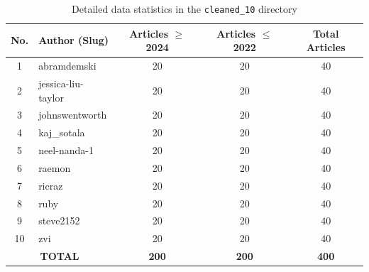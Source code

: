 \documentclass[12pt, a4paper]{article}
\begin{document}
\begin{table}[H]
\centering
\caption{Detailed data statistics in the \texttt{cleaned\_10} directory}
\label{tab:dataset_c10}
\begin{tabular}{|c|l|c|c|c|}
\hline
\textbf{No.} & \textbf{Author (Slug)} & \textbf{Articles $\ge$ 2024} & \textbf{Articles $\le$ 2022} & \textbf{Total Articles} \\ \hline
1 & abramdemski & 20 & 20 & 40 \\ \hline
2 & jessica-liu-taylor & 20 & 20 & 40 \\ \hline
3 & johnswentworth & 20 & 20 & 40 \\ \hline
4 & kaj\_sotala & 20 & 20 & 40 \\ \hline
5 & neel-nanda-1 & 20 & 20 & 40 \\ \hline
6 & raemon & 20 & 20 & 40 \\ \hline
7 & ricraz & 20 & 20 & 40 \\ \hline
8 & ruby & 20 & 20 & 40 \\ \hline
9 & steve2152 & 20 & 20 & 40 \\ \hline
10 & zvi & 20 & 20 & 40 \\ \hline
\multicolumn{2}{|c|}{\textbf{TOTAL}} & \textbf{200} & \textbf{200} & \textbf{400} \\ \hline
\end{tabular}
\end{table}
\end{document}
